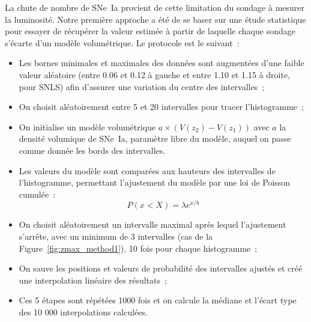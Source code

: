\documentclass[../main/main.tex]{subfiles}
\begin{document}
La chute de nombre de SNe~Ia provient de cette limitation du sondage à mesurer
la luminosité. Notre première approche a été de se baser sur une étude
statistique pour essayer de récupérer la valeur estimée à partir de laquelle
chaque sondage s'écarte d'un modèle volumétrique. Le protocole est le suivant~:
\begin{itemize}
    \item Les bornes minimales et maximales des données sont augmentées d'une
        faible valeur aléatoire (entre 0.06 et 0.12 à gauche et entre 1.10 et
        1.15 à droite, pour SNLS) afin d'assurer une variation du centre des
        intervalles~;
    \item On choisit aléatoirement entre 5 et 20 intervalles pour tracer
        l'histogramme~;
    \item On initialise un modèle volumétrique $a\times
        \left(V(z_2)-V(z_1)\right)$ avec $a$ la densité volumique de SNe~Ia,
        paramètre libre du modèle, auquel on passe comme donnée les bords des
        intervalles.
    \item Les valeurs du modèle sont comparées aux hauteurs des
        intervalles de l'histogramme, permettant l'ajustement du modèle par une
        loi de Poisson cumulée~:
        \begin{equation}\label{eq:poisson}
            P(x<X) = \lambda e^{x/b}
        \end{equation}
    \item On choisit aléatoirement un intervalle maximal après lequel
        l'ajustement s'arrête, avec un minimum de 3 intervalles (cas de la
        Figure~\ref{fig:zmax_method1}), 10 fois pour chaque histogramme~;
    \item On sauve les positions et valeurs de probabilité des intervalles
        ajustés et créé une interpolation linéaire des résultats~;
    \item Ces 5 étapes sont répétées 1000 fois et on calcule la médiane et
        l'écart type des 10 000 interpolations calculées.
\end{itemize}

\end{document}
